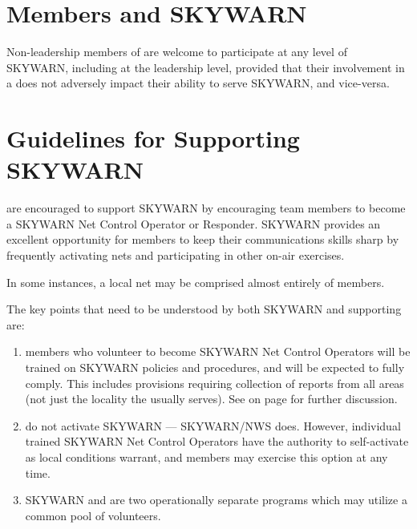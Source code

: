 \documentclass[pdflatex,letterpaper,twoside,12pt]{book}
\begin{document}
\section{\tpteam Members and SKYWARN}

Non-leadership members of \tpteams are welcome to participate at any level of SKYWARN, including at the leadership level, provided that their involvement in a \tpteam does not adversely impact their ability to serve SKYWARN, and vice-versa.


\section{Guidelines for \tpteams Supporting SKYWARN}


\tpteams are encouraged to support SKYWARN by encouraging team members to become a SKYWARN Net Control Operator or Responder.  SKYWARN provides an excellent opportunity for \tpteam members to keep their communications skills sharp by frequently activating nets and participating in other on-air exercises.

In some instances, a local net may be comprised almost entirely of \tpteam members.

The key points that need to be understood by both SKYWARN and supporting \tpteams are:

\begin{enumerate}
\item \tpteam members who volunteer to become SKYWARN Net Control Operators will be trained on SKYWARN policies and procedures, and will be expected to fully comply.  This includes provisions requiring collection of reports from all areas (not just the locality the \tpteam usually serves).  See  on page \pageref{sponsorship-of-nets} for further discussion.
\item  \tpteams do not activate SKYWARN --- SKYWARN/NWS does.  However, individual trained SKYWARN Net Control Operators have the authority to self-activate as local conditions warrant, and \tpteam members may exercise this option at any time.
\item  SKYWARN and \tpteams are two operationally separate programs which may utilize a common pool of volunteers.
\end{enumerate}
\end{document}
